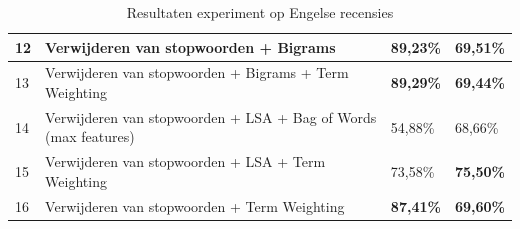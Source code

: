 \begin{table}[H]
\begin{adjustbox}{width=1\textwidth}
\begin{tabular}{|l|l|l|l|}
12       & Verwijderen van stopwoorden + Bigrams                                    & {\bf 89,23\%}                           & {\bf 69,51\%}                  \\ \hline
13       & Verwijderen van stopwoorden + Bigrams + Term Weighting                   & {\bf 89,29\%}                           & {\bf 69,44\%}                  \\ \hline
14       & Verwijderen van stopwoorden + LSA + Bag of Words (max features)                    & 54,88\%                                 & 68,66\%                        \\ \hline
15       & Verwijderen van stopwoorden + LSA + Term Weighting                          & 73,58\%                                 & {\bf 75,50\%}                  \\ \hline
16       & Verwijderen van stopwoorden + Term Weighting                                        & {\bf 87,41\%}                           & {\bf 69,60\%}                  \\ \hline
\end{tabular}
\end{adjustbox}

\caption{Resultaten experiment op Engelse recensies}
\label{tabel: resultaten engelse gevoelsanalyse}
\end{table}

